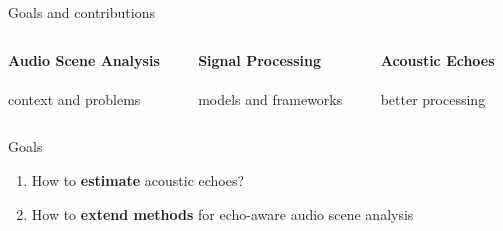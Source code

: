 \begin{frame}{Goals and contributions}

    \begin{columns}[onlytextwidth]
        \begin{column}[T]{0.3\linewidth}
            \centering
            \textbf{Audio Scene Analysis}
            \\\downarrow
            \\context and problems
        \end{column}\hfill
        \begin{column}[T]{0.3\linewidth}
            \centering
            \textbf{Signal Processing}
            \\\downarrow
            \\models and frameworks
        \end{column}\hfill
        \begin{column}[T]{0.3\linewidth}
            \centering
            \textbf{Acoustic Echoes}
            \\\downarrow
            \\better processing
        \end{column}\hfill
    \end{columns}

    \vfill
    \begin{mydefblock}{Goals}
        \begin{enumerate}
            \item How to \textbf{estimate} acoustic echoes?
            \item How to \textbf{extend methods} for echo-aware audio scene analysis
        \end{enumerate}
    \end{mydefblock}


\end{frame}
